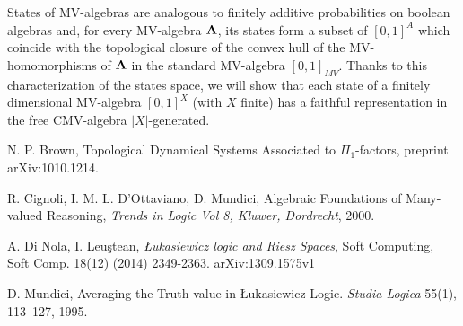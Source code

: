 \documentclass[10pt]{amsproc}
\theoremstyle{definition}
\begin{document}
States of MV-algebras \cite{munstates} are analogous to finitely additive probabilities on boolean algebras and, for every MV-algebra ${\bf A}$, its states form a subset of $[0,1]^A$ which coincide with the topological closure of the convex hull of the MV-homomorphisms of ${\bf A}$ in the standard MV-algebra $[0,1]_{MV}$. Thanks to this characterization of the states space, we will show that each state of a finitely dimensional MV-algebra $[0,1]^X$ (with $X$ finite) has a faithful representation in the free CMV-algebra $|X|$-generated. 
\begin{thebibliography}{9}

N. P. Brown, Topological Dynamical Systems Associated to $\Pi_1$-factors, preprint arXiv:1010.1214.

R. Cignoli, I. M. L. D'Ottaviano, D. Mundici, Algebraic Foundations of Many-valued Reasoning, {\em Trends in Logic Vol 8, Kluwer, Dordrecht}, 2000.

A. Di Nola, I. Leu\c stean, \textit{\L ukasiewicz logic and Riesz Spaces}, Soft Computing, Soft Comp. 18(12) (2014) 2349-2363. arXiv:1309.1575v1

D. Mundici, Averaging the Truth-value in {\L}ukasiewicz Logic. {\em Studia Logica} 55(1), 113--127, 1995. 

\end{thebibliography}
\end{document}
